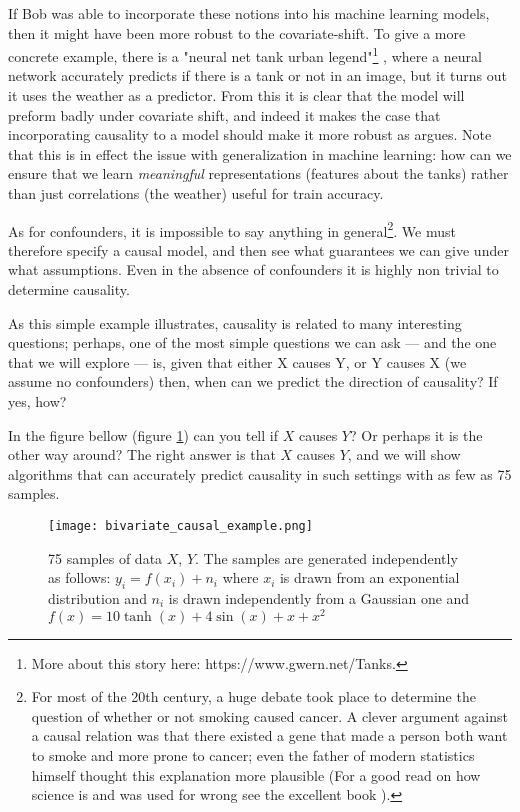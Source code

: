 If Bob was able to incorporate these notions into his machine learning models, then it might have been more
robust to the covariate-shift. To give a more concrete example, there is a "neural net tank urban legend"\footnote{
    More about this story here: https://www.gwern.net/Tanks.
}
, where a neural network accurately predicts if there is a tank or not in an image, but it turns out it uses the 
weather as a predictor. From this it is clear that the model will preform badly under covariate shift, and indeed
it makes the case that incorporating causality to a model should make it more robust as
\cite{scholkopf2019causality} argues. Note that this is in effect the issue with generalization in machine learning:
how can we ensure that we learn \textit{meaningful} representations (features about the tanks) rather than just
correlations (the weather) useful for train accuracy. 

As for confounders, it is impossible to say anything in general\footnote{
    For most of the 20th century, a huge debate took place to determine the question of whether or not 
    smoking caused cancer. A clever argument against a causal relation was that there existed a gene that 
    made a person both want to smoke and more prone to cancer; even the father of modern statistics
    himself thought this explanation more plausible (For a good read on how science is and was used 
    for wrong see the excellent book \cite{NaomiMerchants}).
    
}. We must therefore specify a causal model, and
then see what guarantees we can give under what assumptions. Even in the absence of confounders it is highly 
non trivial to determine causality.

As this simple example illustrates, causality is related to many interesting questions; perhaps, one of the most 
simple questions we can ask --- and the one that we will explore --- is, given that either X causes Y, or Y causes X
(we assume no confounders) then, when 
can we predict the direction of causality? If yes, how? 

In the figure bellow (figure \ref{fig:simple_bivariate_example}) can you tell if $X$ causes $Y$? Or perhaps
it is the other way around? The right answer is that $X$ causes $Y$, and we will show algorithms that 
can accurately predict causality in such settings with as few as 75 samples. 

\begin{figure}[H]
    \centering
    \texttt{[image: bivariate\_causal\_example.png]}
    \caption{75 samples of data $X$, $Y$.  The samples are generated independently as follows:
    $y_i = f(x_i) + n_i$ where $x_i$ is drawn from an exponential distribution and $n_i$ is drawn 
    independently from a Gaussian one and $f(x) = 10 \tanh(x) + 4\sin(x) + x + x^2$}
    \label{fig:simple_bivariate_example}
\end{figure}

